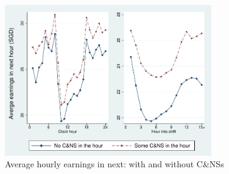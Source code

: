 \documentclass[reviewmode]{restud}
\begin{document}
\begin{figure}
	{\centering
		\includegraphics[width=0.8\textwidth]{./fg/modelfree_earnings_vert.pdf}
		\caption{Average hourly earnings in next: with and without C\&NSs}
		\label{fg:earningsbyhour}
	}
\end{figure}


\FloatBarrier
\end{document}
